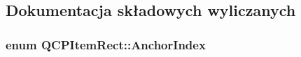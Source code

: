 \subsection{Dokumentacja składowych wyliczanych}
\subsubsection[{\texorpdfstring{Anchor\+Index}{AnchorIndex}}]{\setlength{\rightskip}{0pt plus 5cm}enum {\bf Q\+C\+P\+Item\+Rect\+::\+Anchor\+Index}\hspace{0.3cm}{\ttfamily [protected]}}\hypertarget{class_q_c_p_item_rect_af0ebba58e6bca4851c4db726691ec0d3}{}\label{class_q_c_p_item_rect_af0ebba58e6bca4851c4db726691ec0d3}
